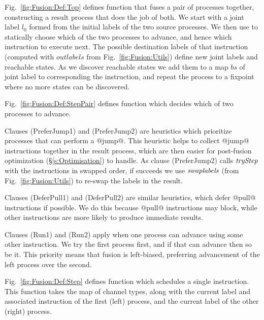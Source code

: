 



\smallskip
Fig.~\ref{fig:Fusion:Def:Top} defines function  that fuses a pair of processes together, constructing a result process that does the job of both. We start with a joint label $l_0$ formed from the initial labels of the two source processes. We then use  to statically choose which of the two processes to advance, and hence which instruction to execute next. The possible destination labels of that instruction (computed with $outlabels$ from Fig.~\ref{fig:Fusion:Utils}) define new joint labels and reachable states. As we discover reachable states we add them to a map $bs$ of joint label to corresponding the instruction, and repeat the process to a fixpoint where no more states can be discovered.



\eject{}
Fig.~\ref{fig:Fusion:Def:StepPair} defines function  which decides which of two processes to advance.

Clauses (PreferJump1) and (PreferJump2) are heuristics which prioritize processes that can perform a @jump@. This heuristic helps to collect @jump@ instructions together in the result process, which are then easier for post-fusion optimization (\S\ref{s:Optimisation}) to handle. As clause (PreferJump2) calls $\textit{tryStep}$ with the instructions in swapped order, if  succeeds we use $\textit{swaplabels}$ (from Fig.~\ref{fig:Fusion:Utils}) to re-swap the labels in the result.

Clauses (DeferPull1) and (DeferPull2) are similar heuristics, which defer @pull@ instructions if possible. We do this because @pull@ instructions may block, while other instructions are more likely to produce immediate results.

Clauses (Run1) and (Run2) apply when one process can advance using some other instruction. We try the first process first, and if that can advance then so be it. This priority means that fusion is left-biased, preferring advancement of the left process over the second.




\smallskip
Fig.~\ref{fig:Fusion:Def:Step} defines function  which schedules a single instruction. This function takes the map of channel types, along with the current label and associated instruction of the first (left) process, and the current label of the other (right) process.

